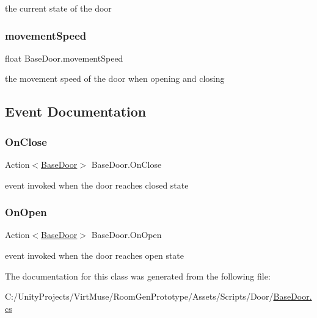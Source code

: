 the current state of the door 

\mbox{\label{class_base_door_aace8dcf06aaae9d78ebd0d55931ab3e3}} 
\subsubsection{\texorpdfstring{movement\+Speed}{movementSpeed}}
{\footnotesize\ttfamily float Base\+Door.\+movement\+Speed\hspace{0.3cm}{\ttfamily [protected]}}



the movement speed of the door when opening and closing 



\subsection{Event Documentation}
\mbox{\label{class_base_door_a382fd7054c500c9075ef67792f39eab5}} 
\subsubsection{\texorpdfstring{On\+Close}{OnClose}}
{\footnotesize\ttfamily Action$<$\mbox{\hyperlink{class_base_door}{Base\+Door}}$>$ Base\+Door.\+On\+Close}



event invoked when the door reaches closed state 

\mbox{\label{class_base_door_a88b84b3eafa96f6a3290b0aa5b55d9c0}} 
\subsubsection{\texorpdfstring{On\+Open}{OnOpen}}
{\footnotesize\ttfamily Action$<$\mbox{\hyperlink{class_base_door}{Base\+Door}}$>$ Base\+Door.\+On\+Open}



event invoked when the door reaches open state 



The documentation for this class was generated from the following file\+:\begin{DoxyCompactItemize}
\item 
C\+:/\+Unity\+Projects/\+Virt\+Muse/\+Room\+Gen\+Prototype/\+Assets/\+Scripts/\+Door/\mbox{\hyperlink{_base_door_8cs}{Base\+Door.\+cs}}\end{DoxyCompactItemize}
